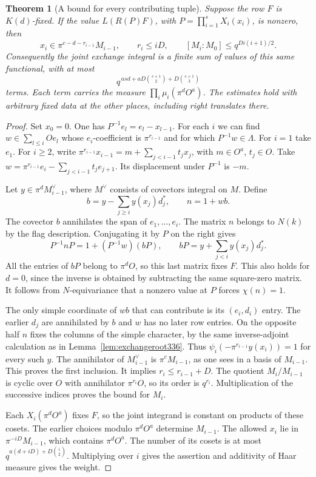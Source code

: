 \documentclass[a4paper,11pt]{article}
\newtheorem{theorem}[proposition]{Theorem}
\theoremstyle{definition}
\theoremstyle{remark}
\numberwithin{equation}{section}
\begin{document}
\begin{theorem}[A bound for every contributing tuple]\label{thm:flagindex336}
Suppose the row \(F\) is \(K(d)\)-fixed. If the value
\(L(R(P)F)\), with \(P=\prod_{i=1}^s X_i(x_i)\), is nonzero, then
\[
 x_i\in\pi^{c-d-r_{i-1}}M_{i-1},\qquad
 r_i\le iD,\qquad [M_i:M_0]\le q^{D i(i+1)/2}.
\]
Consequently the joint exchange integral is a finite sum of values
of this same functional, with at most
\[
       q^{\,asd+aD\binom{s+1}{2}+D\binom{s+1}{3}}
\]
terms. Each term carries the measure
\(\prod_i\mu_i(\pi^dO^a)\). The estimates hold with arbitrary fixed
data at the other places, including right translates there.
\end{theorem}
\begin{proof}
Set \(x_0=0\). One has \(P^{-1}e_l=e_l-x_{l-1}\). For each \(i\)
we can find \(w\in\sum_{l\le i}Oe_l\) whose \(e_i\)-coefficient
is \(\pi^{r_{i-1}}\) and for which \(P^{-1}w\in\Lambda\).
For \(i=1\) take \(e_1\). For \(i\ge2\), write
\(\pi^{r_{i-1}}x_{i-1}=m+\sum_{j<i-1}t_jx_j\), with
\(m\in O^a\), \(t_j\in O\). Take
\(w=\pi^{r_{i-1}}e_i-\sum_{j<i-1}t_je_{j+1}\).
Its displacement under \(P^{-1}\) is \(-m\).

Let \(y\in\pi^d M_{i-1}^\vee\), where \(M^\vee\) consists of
covectors integral on \(M\). Define
\[
 b=y-\sum_{j\ge i}y(x_j)d_j^*,\qquad n=1+w b .
\]
The covector \(b\) annihilates the span of \(e_1,\ldots,e_i\).
The matrix \(n\) belongs to \(N(k)\) by the flag description.
Conjugating it by \(P\) on the right gives
\[
 P^{-1}nP=1+(P^{-1}w)(bP),\qquad
 bP=y+\sum_{j<i} y(x_j)d_j^* .
\]
All the entries of \(bP\) belong to \(\pi^dO\), so this last
matrix fixes \(F\). This also holds for \(d=0\), since the inverse
is obtained by subtracting the same square-zero matrix.
It follows from \(N\)-equivariance that a nonzero value at \(P\)
forces \(\chi(n)=1\).

The only simple coordinate of \(wb\) that can contribute is its
\((e_i,d_i)\) entry. The earlier \(d_j\) are annihilated by \(b\)
and \(w\) has no later row entries. On the opposite half \(n\)
fixes the columns of the simple character, by the same
inverse-adjoint calculation as in Lemma~\ref{lem:exchangeroot336}.
Thus \(\psi_i(-\pi^{r_{i-1}}y(x_i))=1\) for every such \(y\).
The annihilator of \(M_{i-1}^\vee\) is \(\pi^cM_{i-1}\), as
one sees in a basis of \(M_{i-1}\). This proves the first
inclusion. It implies \(r_i\le r_{i-1}+D\). The quotient
\(M_i/M_{i-1}\) is cyclic over \(O\) with annihilator
\(\pi^{r_i}O\), so its order is \(q^{r_i}\). Multiplication of
the successive indices proves the bound for \(M_i\).

Each \(X_i(\pi^d O^a)\) fixes \(F\), so the joint integrand
is constant on products of these cosets. The earlier choices
modulo \(\pi^dO^a\) determine \(M_{i-1}\). The allowed \(x_i\)
lie in \(\pi^{-iD}M_{i-1}\), which contains \(\pi^dO^a\).
The number of its cosets is at most
\(q^{a(d+iD)+D\binom{i}{2}}\). Multiplying over \(i\) gives the
assertion and additivity of Haar measure gives the weight.
\end{proof}
\end{document}
